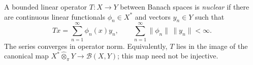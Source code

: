 
A bounded linear operator $T:X\to Y$ between Banach spaces is \emph{nuclear} if there are continuous linear functionals $\phi_n\in X^*$ and vectors $y_n\in Y$ such that
\[
Tx=\sum_{n=1}^\infty\phi_n(x)y_n,\qquad
\sum_{n=1}^\infty\|\phi_n\|\,\|y_n\|<\infty.
\]
The series converges in operator norm. Equivalently, $T$ lies in the image of the canonical map $X^*\widehat\otimes_\pi Y\to\mathcal B(X,Y)$; this map need not be injective.
